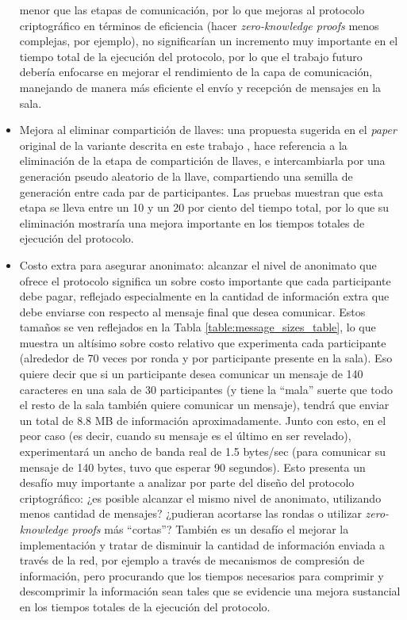 \begin{itemize}
	menor que las etapas de comunicación, por lo que mejoras al protocolo criptográfico en 
	términos de eficiencia (hacer \emph{zero-knowledge proofs} menos complejas, por ejemplo), no 
	significarían un incremento muy importante en el tiempo total de la ejecución del protocolo, 
	por lo que el trabajo futuro debería enfocarse en mejorar el rendimiento de la capa 
	de comunicación, manejando de manera más eficiente el envío y recepción de mensajes en la sala.
	\item Mejora al eliminar compartición de llaves: una propuesta sugerida en el \emph{paper} 
	original de la variante descrita en este trabajo \cite{franck2014dining}, hace referencia 
	a la eliminación de la etapa de compartición de llaves, e intercambiarla por una generación 
	pseudo aleatorio de la llave, compartiendo una semilla de generación entre cada par de participantes. 
	Las pruebas muestran que esta etapa se lleva entre un 10 y un 20 por ciento del tiempo total, 
	por lo que su eliminación mostraría una mejora importante en los tiempos totales de 
	ejecución del protocolo. 
	\item Costo extra para asegurar anonimato: alcanzar el nivel de anonimato que ofrece 
	el protocolo significa un sobre costo importante que cada participante debe pagar, reflejado 
	especialmente en la cantidad de información extra que debe enviarse con respecto al mensaje 
	final que desea comunicar. Estos tamaños se ven reflejados en la Tabla \ref{table:message_sizes_table}, 
	lo que muestra un altísimo sobre costo relativo que experimenta cada participante (alrededor de 
	70 veces por ronda y por participante presente en la sala). Eso quiere decir que si un participante 
	desea comunicar un mensaje de 140 caracteres en una sala de 30 participantes (y tiene la ``mala'' suerte 
	que todo el resto de la sala también quiere comunicar un mensaje), tendrá que enviar un 
	total de 8.8 MB de información aproximadamente. Junto con esto, en el peor caso (es decir, cuando 
	su mensaje es el último en ser revelado), experimentará un ancho de banda real de 1.5 bytes/sec 
	(para comunicar su mensaje de 140 bytes, tuvo que esperar 90 segundos). Esto presenta 
	un desafío muy importante a analizar por parte del diseño del protocolo criptográfico: ¿es 
	posible alcanzar el mismo nivel de anonimato, utilizando menos cantidad de mensajes? 
	¿pudieran acortarse las rondas o utilizar \emph{zero-knowledge proofs} más ``cortas''? 
	También es un desafío el mejorar la implementación y tratar de disminuir la cantidad de información 
	enviada a través de la red, por ejemplo a través de mecanismos de compresión de información, pero 
	procurando que los tiempos necesarios para comprimir y descomprimir la información sean tales 
	que se evidencie una mejora sustancial en los tiempos totales de la ejecución del protocolo.
\end{itemize}

